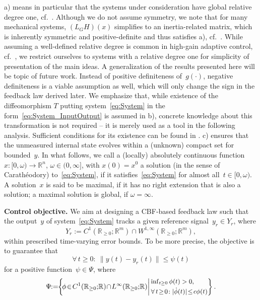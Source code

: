 \documentclass[journal,twoside,web]{ieeeconf}
\newcommand{\R}{\mathbb{R}}
\begin{document}
%
a) means in particular that the systems under consideration have global relative degree one, cf.~\cite[Def.~5.1]{byrnes1991asymptotic}.
Although we do not assume symmetry, we note that for many mechanical systems, $(L_GH)(x)$ simplifies to an inertia-related matrix, which is inherently symmetric and positive-definite and thus satisfies a), cf.~\cite{berger2021tracking}.
While assuming a well-defined relative degree is common in high-gain adaptive control, cf.~\cite{IlchRyan02b,Hack17}, we restrict ourselves to systems with a relative degree one for simplicity of presentation of the main ideas.
A generalization of the results presented here will be topic of future work.
Instead of positive definiteness of~$g(\cdot)$, negative definiteness is a viable assumption as well, which will only change the sign in the feedback law derived later.
We emphasize that, while existence of the diffeomorphism $T$ 
putting system~\eqref{eq:System} in the form~\eqref{eq:System_InputOutput} is assumed in b), concrete knowledge about this transformation is not required -- it is merely used as a tool in the following analysis.
Sufficient conditions for its existence can be found in \cite[Cor.~5.6]{byrnes1991asymptotic}.
c) ensures that the unmeasured internal state evolves within a (unknown) compact set for bounded~$y$.
In what follows, we call a (locally) absolutely continuous function $x: [0, \omega) \to \R^n$, $\omega\in (0,\infty]$, with $x(0) =x^0$ a solution (in the sense of Carathéodory) to~\eqref{eq:System}, if it satisfies~\eqref{eq:System} for almost all~$t \in [0,\omega)$. A solution~$x$ is said to be maximal, if it has no right extension that is also a solution; a maximal solution is global, if $\omega=\infty$.	

\textbf{Control objective.}
We aim at designing a CBF-based feedback law such that the output~$y$ of system~\eqref{eq:System} tracks a given reference signal~$y_r \in Y_r$, where
\begin{equation} \label{eq:ReferenceSignal}
        Y_r := C^1(\R_{\ge 0};\R^m) \cap W^{1,\infty}(\R_{\ge 0};\R^m),
\end{equation}
within prescribed time-varying error bounds.
To be more precise, the objective is to guarantee that
\begin{equation} \label{eq:ControlObjective}
   \forall \, t \ge 0:\  \| y(t) - y_r(t) \| \le \psi(t) 
\end{equation}
for a positive function~$\psi \in \Psi$, 
where
\begin{equation} \label{Def:FunnelBoundary}
    \begin{small}
    \Psi \!\!:=\! \!\left\{  \!\phi \!\in\! C^1 (\R_{\ge 0};\!\R) \!\cap\! L^{\infty}(\R_{\ge 0};\!\R)  \!  \left|  \! \! \begin{array}{l}
             \inf_{t\ge 0} \phi(t)>0,  \\[1mm]
             \forall\, t \!\ge\! 0 \!:  |\dot \phi(t)| \!\le\! c \phi(t) \! \! \!
        \end{array} \!  \right.\right\}   .
    \end{small}
\end{equation}
\end{document}
